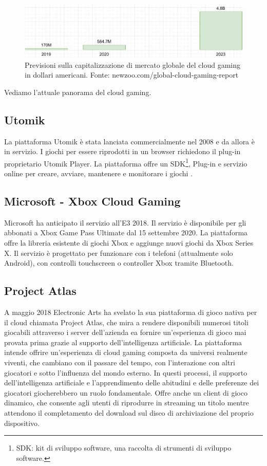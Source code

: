\begin{figure}[H]
	\includegraphics[width=\linewidth]{immagini/Newzoo_Cloud_Gaming_Revenues}
	\caption{Previsioni sulla capitalizzazione di mercato globale del cloud gaming in dollari americani. Fonte: newzoo.com/global-cloud-gaming-report}
	\label{fig:Newzoo_Cloud_Gaming_Revenues_Sept_2020}
\end{figure}

Vediamo l'attuale panorama del cloud gaming.

\subsection{Utomik}
La piattaforma Utomik è stata lanciata commercialmente nel 2008 e da allora è in servizio. I giochi per essere riprodotti in un browser richiedono il plug-in proprietario Utomik Player. La piattaforma offre un SDK\footnote{SDK: kit di sviluppo software, una raccolta di strumenti di sviluppo software.}, Plug-in e servizio online per creare, avviare, mantenere e monitorare i giochi \cite{Utomik}.

\subsection{Microsoft - Xbox Cloud Gaming}
Microsoft ha anticipato il servizio all'E3 2018. Il servizio è disponibile per gli abbonati a Xbox Game Pass Ultimate dal 15 settembre 2020. La piattaforma offre la libreria esistente di giochi Xbox e aggiunge nuovi giochi da Xbox Series X. Il servizio è progettato per funzionare con i telefoni (attualmente solo Android), con controlli touchscreen o controller Xbox tramite Bluetooth\cite{Xbox_Game_Pass_cloud_gaming}.

\subsection{Project Atlas}
A maggio 2018 Electronic Arts ha svelato la sua piattaforma di gioco nativa per il cloud chiamata Project Atlas, che mira a rendere disponibili numerosi titoli giocabili attraverso i server dell'azienda ea fornire un'esperienza di gioco mai provata prima grazie al supporto dell'intelligenza artificiale. La piattaforma intende offrire un'esperienza di cloud gaming composta da universi realmente viventi, che cambiano con il passare del tempo, con l'interazione con altri giocatori e sotto l'influenza del mondo esterno. In questi processi, il supporto dell'intelligenza artificiale e l'apprendimento delle abitudini e delle preferenze dei giocatori giocherebbero un ruolo fondamentale. Offre anche un client di gioco dinamico, che consente agli utenti di riprodurre in streaming un titolo mentre attendono il completamento del download sul disco di archiviazione del proprio dispositivo\cite{Project_Atlas}.

